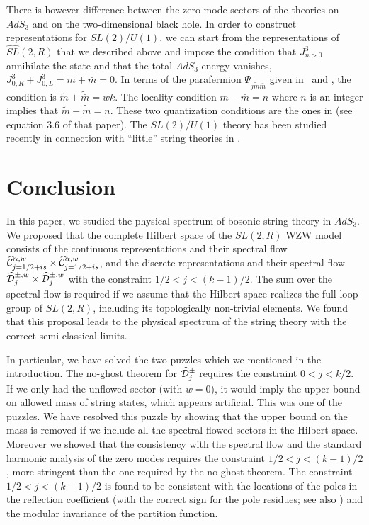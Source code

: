 There is however difference between the zero mode sectors
of the theories on $AdS_3$ and on the two-dimensional black hole.  
In order to construct representations for $SL(2)/U(1)$, we can 
start from the representations of $\widehat{SL}(2,R)$ that we described
above and  impose the condition that $J^3_{n>0}$ annihilate the state and
that  the total $AdS_3$ energy 
vanishes, $J^3_{0,R} + J^3_{0,L} = m + \bar m =0$. 
In terms of the parafermion $\Psi_{j\tilde m \tilde{\bar m}}$ given in 
\decomp\ and \decflw , the condition is
$ \tilde m + \tilde{\bar m} = w k$. The locality condition
$  m -{\bar m} = n$ where $n$ is an integer implies 
that $\tilde m - \tilde{\bar m} = n$.
 These two quantization conditions are the ones
in \cite{Dijkgraaf:1992ba}  (see equation 3.6 of that paper).
The $SL(2)/U(1)$ theory has been studied recently in connection
with ``little'' string theories in \cite{Giveon:1999px,Giveon:1999tq}.


\section{Conclusion}

In this paper, we studied the physical spectrum of bosonic 
string theory in $AdS_3$. We proposed that the complete
Hilbert space of the $SL(2,R)$ WZW model consists of 
the continuous representations 
and their spectral flow 
$\widehat{\cal C}_{j=1/2 + is}^{\alpha,w}
\times \widehat{\cal C}_{j=1/2 + is}^{\alpha,w}$,
and the discrete representations and their spectral
flow $\widehat{\cal D}_j^{\pm,w}
\times \widehat{\cal D}_j^{\pm,w}$
with the constraint $1/2 < j < (k-1)/2$.
The sum over the spectral
flow is required if we assume that the Hilbert space
realizes the full loop group of $SL(2,R)$, including
its topologically non-trivial elements. We found
that this proposal leads to the physical spectrum
of the string theory with the correct semi-classical limits. 

In particular, we have solved the two puzzles which we mentioned
in the introduction. The no-ghost theorem for $\widehat{\cal D}_j^\pm$
requires the constraint $0< j < k/2$. If we only had the unflowed sector
(with $w=0$), it would imply the upper bound on 
allowed mass of string states, which appears artificial. 
This was one of the puzzles. We have resolved this puzzle
by showing
that the upper bound on the mass is removed if we include
all the spectral flowed sectors in the Hilbert space. 
Moreover we showed that the consistency with the spectral flow
and the standard harmonic analysis of the zero modes
requires the constraint $1/2< j < (k-1)/2$, more stringent than
the one required by the no-ghost theorem. 
The constraint $1/2 < j < (k-1)/2$ is found to be consistent 
with the locations of the poles in the reflection coefficient 
(with the correct sign for the pole residues; see also
\cite{Giveon:1999px})
 and 
the modular invariance of the partition function. 

